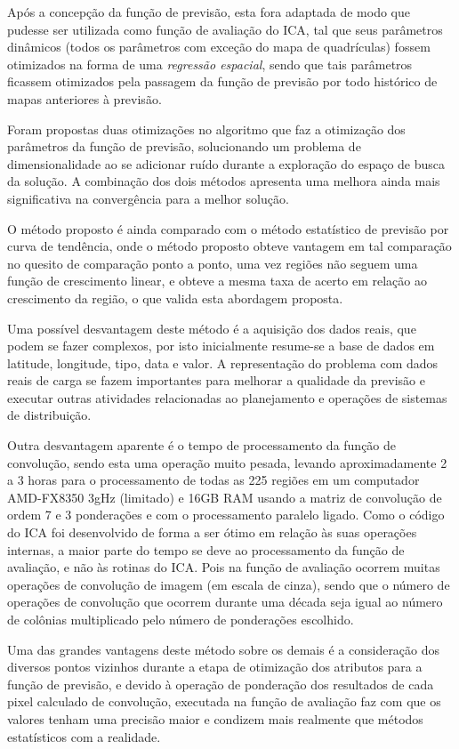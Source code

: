 Após a concepção da função de previsão, esta fora adaptada de modo que pudesse ser utilizada como função de avaliação do ICA, tal que seus parâmetros dinâmicos (todos os parâmetros com exceção do mapa de quadrículas) fossem otimizados na forma de uma \emph{regressão espacial}, sendo que tais parâmetros ficassem otimizados pela passagem da função de previsão por todo histórico de mapas anteriores à previsão. 

Foram propostas duas otimizações no algoritmo que faz a otimização dos parâmetros da função de previsão, solucionando um problema de dimensionalidade ao se adicionar ruído durante a exploração do espaço de busca da solução. A combinação dos dois métodos apresenta uma melhora ainda mais significativa na convergência para a melhor solução. 

O método proposto é ainda comparado com o método estatístico de previsão por curva de tendência, onde o método proposto obteve vantagem em tal comparação no quesito de comparação ponto a ponto, uma vez regiões não seguem uma função de crescimento linear, e obteve a mesma taxa de acerto em relação ao crescimento da região, o que valida esta abordagem proposta.

Uma possível desvantagem deste método é a aquisição dos dados reais, que podem se fazer complexos, por isto inicialmente resume-se a base de dados em latitude, longitude, tipo, data e valor. A representação do problema com dados reais de carga se fazem importantes para melhorar a qualidade da previsão e executar outras atividades relacionadas ao planejamento e operações de sistemas de distribuição. 

Outra desvantagem aparente é o tempo de processamento da função de convolução, sendo esta uma operação muito pesada, levando aproximadamente 2 a 3 horas para o processamento de todas as 225 regiões em um computador AMD-FX8350 3gHz (limitado) e 16GB RAM usando a matriz de convolução de ordem 7 e 3 ponderações e com o processamento paralelo ligado. Como o código do ICA foi desenvolvido de forma a ser ótimo em relação às suas operações internas, a maior parte do tempo se deve ao processamento da função de avaliação, e não às rotinas do ICA. Pois na função de avaliação ocorrem muitas operações de convolução de imagem (em escala de cinza), sendo que o número de operações de convolução que ocorrem durante uma década seja igual ao número de colônias multiplicado pelo número de ponderações escolhido. 

Uma das grandes vantagens deste método sobre os demais é a consideração dos diversos pontos vizinhos durante a etapa de otimização dos atributos para a função de previsão, e devido à operação de ponderação dos resultados de cada pixel calculado de convolução, executada na função de avaliação faz com que os valores tenham uma precisão maior e condizem mais realmente que métodos estatísticos com a realidade. 

